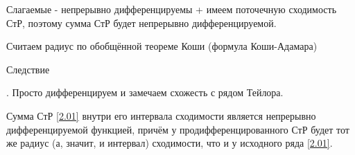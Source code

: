 \begin{col-answer-preambule}
\end{col-answer-preambule}

\begin{plan}
\item Слагаемые - непрерывно дифференцируемы + имеем поточечную сходимость СтР, поэтому сумма СтР будет непрерывно дифференцируемой.
\item Считаем радиус по обобщённой теореме Коши (формула Коши-Адамара)
\end{plan}
Следствие

\begin{plan}
\item. Просто дифференцируем и замечаем схожесть с рядом Тейлора.
\end{plan}
\begin{theorem}
	Сумма СтР \eqref{2.01} внутри его интервала сходимости является непрерывно дифференцируемой функцией, причём у продифференцированного СтР
	будет тот же радиус (а, значит, и интервал) сходимости, что и у исходного ряда \eqref{2.01}.
\end{theorem}
